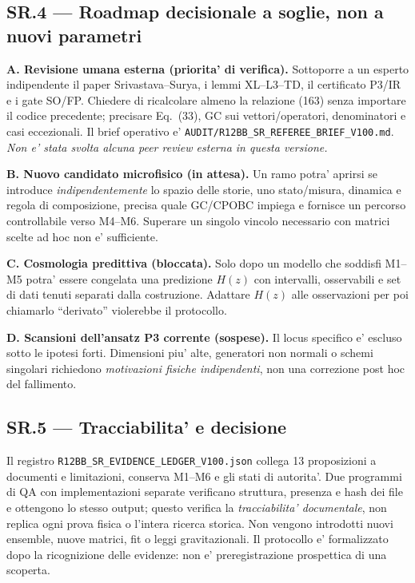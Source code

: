 \documentclass[11pt,a4paper]{article}
\begin{document}
\subsection*{SR.4 --- Roadmap decisionale a soglie, non a nuovi parametri}
\textbf{A. Revisione umana esterna (priorita' di verifica).} Sottoporre a un esperto indipendente il paper Srivastava--Surya, i lemmi XL--L3--TD, il certificato P3/IR e i gate SO/FP. Chiedere di ricalcolare almeno la relazione (163) senza importare il codice precedente; precisare Eq.~(33), GC sui vettori/operatori, denominatori e casi eccezionali. Il brief operativo e' \nolinkurl{AUDIT/R12BB_SR_REFEREE_BRIEF_V100.md}. \emph{Non e' stata svolta alcuna peer review esterna in questa versione.}

\textbf{B. Nuovo candidato microfisico (in attesa).} Un ramo potra' aprirsi se introduce \emph{indipendentemente} lo spazio delle storie, uno stato/misura, dinamica e regola di composizione, precisa quale GC/CPOBC impiega e fornisce un percorso controllabile verso M4--M6. Superare un singolo vincolo necessario con matrici scelte ad hoc non e' sufficiente.

\textbf{C. Cosmologia predittiva (bloccata).} Solo dopo un modello che soddisfi M1--M5 potra' essere congelata una predizione $H(z)$ con intervalli, osservabili e set di dati tenuti separati dalla costruzione. Adattare $H(z)$ alle osservazioni per poi chiamarlo ``derivato'' violerebbe il protocollo.

\textbf{D. Scansioni dell'ansatz P3 corrente (sospese).} Il locus specifico e' escluso sotto le ipotesi forti. Dimensioni piu' alte, generatori non normali o schemi singolari richiedono \emph{motivazioni fisiche indipendenti}, non una correzione post hoc del fallimento.

\subsection*{SR.5 --- Tracciabilita' e decisione}
Il registro \texttt{R12BB\_SR\_EVIDENCE\_LEDGER\_V100.json} collega 13 proposizioni a documenti e limitazioni, conserva M1--M6 e gli stati di autorita'. Due programmi di QA con implementazioni separate verificano struttura, presenza e hash dei file e ottengono lo stesso output; questo verifica la \emph{tracciabilita' documentale}, non replica ogni prova fisica o l'intera ricerca storica. Non vengono introdotti nuovi ensemble, nuove matrici, fit o leggi gravitazionali. Il protocollo e' formalizzato dopo la ricognizione delle evidenze: non e' preregistrazione prospettica di una scoperta.
\end{document}
